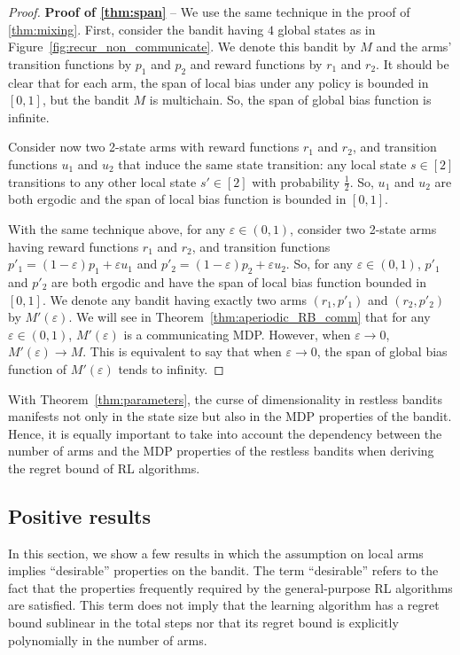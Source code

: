 \begin{proof}
    \textbf{Proof of \ref{thm:span}} -- We use the same technique in the proof of \ref{thm:mixing}.
    First, consider the bandit having $4$ global states as in Figure~\ref{fig:recur_non_communicate}.
    We denote this bandit by $M$ and the arms' transition functions by $p_1$ and $p_2$ and reward functions by $r_1$ and $r_2$.
    It should be clear that for each arm, the span of local bias under any policy is bounded in $[0,1]$, but the bandit $M$ is multichain.
    So, the span of global bias function is infinite.

    Consider now two 2-state arms with reward functions $r_1$ and $r_2$, and transition functions $u_1$ and $u_2$ that induce the same state transition: any local state $s\in[2]$ transitions to any other local state $s'\in[2]$ with probability $\frac12$.
    So, $u_1$ and $u_2$ are both ergodic and the span of local bias function is bounded in $[0,1]$.

    With the same technique above, for any $\varepsilon\in(0,1)$, consider two 2-state arms having reward functions $r_1$ and $r_2$, and transition functions $p'_1=(1-\varepsilon)p_1+\varepsilon u_1$ and $p'_2=(1-\varepsilon)p_2+\varepsilon u_2$.
    So, for any $\varepsilon\in(0,1)$, $p'_1$ and $p'_2$ are both ergodic and have the span of local bias function bounded in $[0,1]$.
    We denote any bandit having exactly two arms $(r_1,p'_1)$ and $(r_2,p'_2)$ by $M'(\varepsilon)$.
    We will see in Theorem~\ref{thm:aperiodic_RB_comm} that for any $\varepsilon\in(0,1)$, $M'(\varepsilon)$ is a communicating MDP.
    However, when $\varepsilon\to0$, $M'(\varepsilon)\to M$.
    This is equivalent to say that when $\varepsilon\to0$, the span of global bias function of $M'(\varepsilon)$ tends to infinity.
\end{proof}

With Theorem~\ref{thm:parameters}, the curse of dimensionality in restless bandits manifests not only in the state size but also in the MDP properties of the bandit.
Hence, it is equally important to take into account the dependency between the number of arms and the MDP properties of the restless bandits when deriving the regret bound of RL algorithms.

\subsection{Positive results}

In this section, we show a few results in which the assumption on local arms implies ``desirable'' properties on the bandit.
The term ``desirable'' refers to the fact that the properties frequently required by the general-purpose RL algorithms are satisfied.
This term does not imply that the learning algorithm has a regret bound sublinear in the total steps nor that its regret bound is explicitly polynomially in the number of arms.

